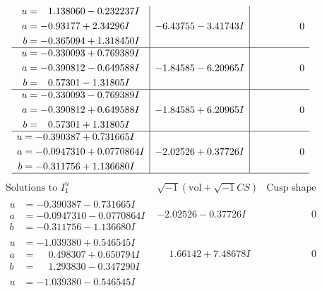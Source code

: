 \documentclass[1p]{elsarticle_modified}
\theoremstyle{definition}
\newcommand{\I}{\sqrt{-1}}
\begin{document}
$$\begin{array}{c|c|c}
\begin{aligned}
u &= \phantom{-}1.138060 - 0.232237 I \\
a &= -0.93177 + 2.34296 I \\
b &= -0.365094 + 1.318450 I\end{aligned}
 & -6.43755 - 3.41743 I & \phantom{-0.000000 } 0 \\ \hline\begin{aligned}
u &= -0.330093 + 0.769389 I \\
a &= -0.390812 - 0.649588 I \\
b &= \phantom{-}0.57301 - 1.31805 I\end{aligned}
 & -1.84585 - 6.20965 I & \phantom{-0.000000 } 0 \\ \hline\begin{aligned}
u &= -0.330093 - 0.769389 I \\
a &= -0.390812 + 0.649588 I \\
b &= \phantom{-}0.57301 + 1.31805 I\end{aligned}
 & -1.84585 + 6.20965 I & \phantom{-0.000000 } 0 \\ \hline\begin{aligned}
u &= -0.390387 + 0.731665 I \\
a &= -0.0947310 + 0.0770864 I \\
b &= -0.311756 + 1.136680 I\end{aligned}
 & -2.02526 + 0.37726 I & \phantom{-0.000000 } 0\\
 \hline 
 \end{array}$$\newpage$$\begin{array}{c|c|c}  
\text{Solutions to }I^u_{1}& \I (\text{vol} + \sqrt{-1}CS) & \text{Cusp shape}\\
 \hline 
\begin{aligned}
u &= -0.390387 - 0.731665 I \\
a &= -0.0947310 - 0.0770864 I \\
b &= -0.311756 - 1.136680 I\end{aligned}
 & -2.02526 - 0.37726 I & \phantom{-0.000000 } 0 \\ \hline\begin{aligned}
u &= -1.039380 + 0.546545 I \\
a &= \phantom{-}0.498307 + 0.650794 I \\
b &= \phantom{-}1.293830 - 0.347290 I\end{aligned}
 & \phantom{-}1.66142 + 7.48678 I & \phantom{-0.000000 } 0 \\ \hline\begin{aligned}
u &= -1.039380 - 0.546545 I \\

\end{aligned}
\end{array}$$
\end{document}
